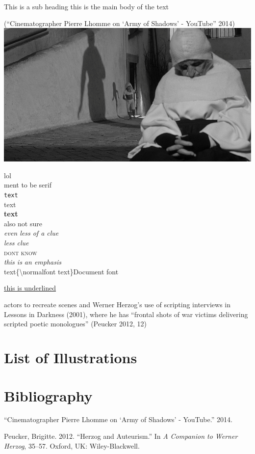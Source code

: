 \documentclass[
  12pt,
]{book}
\newlength{\cslhangindent}
\newlength{\cslentryspacingunit} %
\newenvironment{CSLReferences}[2] %
 {%
  \setlength{\parindent}{0pt}
  \ifodd #1
  \let\oldpar\par
  \def\par{\hangindent=\cslhangindent\oldpar}
  \fi
  \setlength{\parskip}{#2\cslentryspacingunit}
 }%
 {}
\begin{document}
This is a sub heading this is the main body of the text

({``Cinematographer Pierre Lhomme on {`Army of Shadows'} - {YouTube}''} 2014) \includegraphics{fd4fef9a20383db8ff25d8806505b409.png}

\textrm{lol }\\
\textsf{ment to be serif }\\
\texttt{text }\\
\textmd{text }\\
\textbf{text }\\
\textup{also not sure }\\
\textit{even less of a clue }\\
\textsl{less clue }\\
\textsc{dont know }\\
\emph{this is an emphasis }\\
\textnormal{text}\{\textbackslash normalfont text\}Document font

\underline{this is underlined }

actors to recreate scenes and Werner Herzog's use of scripting interviews in Lessons in Darkness (2001), where he has ``frontal shots of war victims delivering scripted poetic monologues'' (Peucker 2012, 12)

\hypertarget{List of Illustrations}{%
\chapter{List of Illustrations}\label{List of Illustrations}}

\hypertarget{bibliography}{%
\chapter*{Bibliography}\label{bibliography}}

\hypertarget{refs}{}
\begin{CSLReferences}{1}{0}
\leavevmode{}%
{``Cinematographer Pierre Lhomme on {`Army of Shadows'} - {YouTube}.''} 2014.

\leavevmode{}%
Peucker, Brigitte. 2012. {``Herzog and Auteurism.''} In \emph{A Companion to Werner Herzog}, 35--57. Oxford, UK: Wiley-Blackwell.

\end{CSLReferences}

\backmatter
\end{document}
